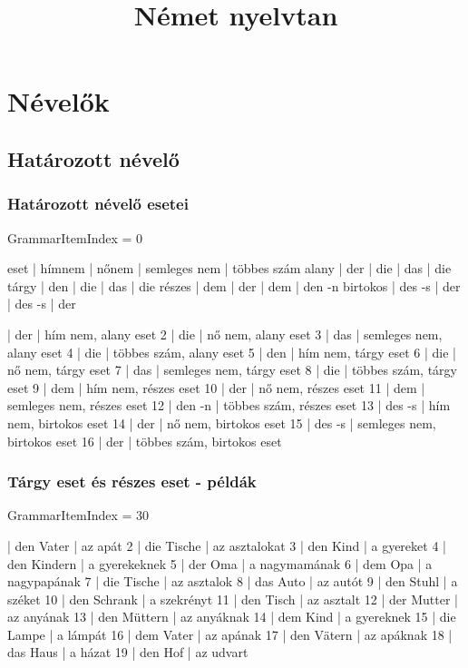 \documentclass{article}
\title{Német nyelvtan}
\newenvironment{desc}{\verbatim}{\endverbatim}
\newenvironment{exmp}{\verbatim}{\endverbatim}
\begin{document}
\maketitle

\tableofcontents

\section{Névelők}

\subsection{Határozott névelő}

\subsubsection{Határozott névelő esetei}

GrammarItemIndex = 0

\begin{desc}
eset     | hímnem | nőnem | semleges nem | többes szám
alany    | der    | die   | das          | die
tárgy    | den    | die   | das          | die
részes   | dem    | der   | dem          | den -n
birtokos | des -s | der   | des -s       | der
\end{desc}

\begin{exmp}
1 | der | hím nem, alany eset
2 | die | nő nem, alany eset
3 | das | semleges nem, alany eset
4 | die | többes szám, alany eset
5 | den | hím nem, tárgy eset
6 | die | nő nem, tárgy eset
7 | das | semleges nem, tárgy eset
8 | die | többes szám, tárgy eset
9 | dem | hím nem, részes eset
10 | der | nő nem, részes eset
11 | dem | semleges nem, részes eset
12 | den -n | többes szám, részes eset
13 | des -s | hím nem, birtokos eset
14 | der | nő nem, birtokos eset
15 | des -s | semleges nem, birtokos eset
16 | der | többes szám, birtokos eset
\end{exmp}

\subsubsection{Tárgy eset és részes eset - példák}

GrammarItemIndex = 30

\begin{exmp}
1 | den Vater | az apát
2 | die Tische | az asztalokat
3 | den Kind | a gyereket
4 | den Kindern | a gyerekeknek
5 | der Oma | a nagymamának
6 | dem Opa | a nagypapának
7 | die Tische | az asztalok
8 | das Auto | az autót
9 | den Stuhl | a széket
10 | den Schrank | a szekrényt
11 | den Tisch | az asztalt
12 | der Mutter | az anyának
13 | den Müttern | az anyáknak
14 | dem Kind | a gyereknek
15 | die Lampe | a lámpát
16 | dem Vater | az apának
17 | den Vätern | az apáknak
18 | das Haus | a házat
19 | den Hof | az udvart
\end{exmp}
\end{document}

